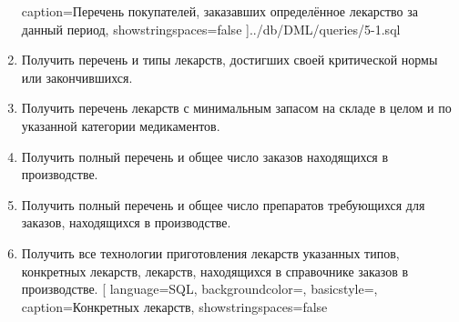 \documentclass[a4paper]{article}
\begin{document}
\begin{enumerate}
					caption={Перечень покупателей, заказавших определённое лекарство за данный период},
					showstringspaces=false
				]{../db/DML/queries/5-1.sql}
				
			\item Получить перечень и типы лекарств, достигших своей критической нормы или закончившихся.
				
				
			\item Получить перечень лекарств с минимальным запасом на складе в целом и по указанной категории медикаментов.
				
				
			\item Получить полный перечень и общее число заказов находящихся в производстве.
				
			\item Получить полный перечень и общее число препаратов требующихся для заказов, находящихся в производстве.
				
			\item Получить все технологии приготовления лекарств указанных типов, конкретных лекарств, лекарств, находящихся в справочнике заказов в производстве.
				[
					language=SQL,
					backgroundcolor=\color{backcolour},
					basicstyle=\scriptsize,
					caption={Конкретных лекарств},
					showstringspaces=false

\end{enumerate}
\end{document}
